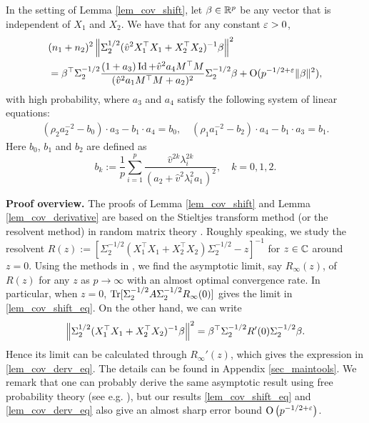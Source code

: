 \begin{lemma}\label{lem_cov_derivative}
In the setting of Lemma \ref{lem_cov_shift}, let $\beta \in \mathbb{R}^p$ be any vector that is independent of $X_1$ and $X_2$. We have that for any constant ${\varepsilon}>0$,
\begin{equation}\label{lem_cov_derv_eq}
\begin{split}
&(n_1+n_2)^2\left\| \Sigma_2^{1/2} (\hat v^2 X_1^{\top}X_1 + X_2^{\top}X_2)^{-1}\beta \right\|^2 \\
&= \beta^{\top} \Sigma_2^{-1/2}  \frac{(1 + a_3)\operatorname{Id} + \hat v^2a_4 {M}^{\top}{M}}{( \hat v^2a_1 {M}^{\top}{M}+a_2)^2} \Sigma_2^{-1/2} \beta +\operatorname{O}(p^{-1/2+{\varepsilon}}\|\beta\|^2),
\end{split}
\end{equation}
with high probability, where $a_{3}$ and $a_4$ satisfy the following system of linear equations:
\begin{gather}\label{eq_a34extra}
		\left(\rho_2  a_2^{-2}-  b_0\right)\cdot  a_3 - b_1 \cdot  a_4
		= b_0, \quad \left(\rho_1 a_1^{-2} -  b_2  \right)\cdot  a_4 -  b_1 \cdot  a_3 = b_1 .
	\end{gather}
Here $b_0$, $b_1$ and $b_2$ are defined as
$$ b_k:= \frac1{p}\sum_{i=1}^p \frac{ \hat v^{2k}\lambda_i^{2k}}{ ( a_2 + \hat v^2\lambda_i^2 a_1)^2  },\quad k=0,1,2.$$
\end{lemma}



\textbf{Proof overview.}
The proofs of Lemma \ref{lem_cov_shift} and Lemma \ref{lem_cov_derivative} are based on the Stieltjes transform method (or the resolvent method) in random matrix theory \cite{bai2009spectral,tao2012topics,erdos2017dynamical}. Roughly speaking, we study the resolvent $R(z):=[\Sigma_2^{-1/2}( X_1^{\top}X_1 + X_2^{\top}X_2)\Sigma_2^{-1/2}-z]^{-1}$ for $z\in \mathbb{C}$ around $z=0$.
Using the methods in \cite{Anisotropic,yang2019spiked}, we find the asymptotic limit, say $R_\infty(z)$, of $R(z)$ for any $z$ as $p\to \infty$ with an almost optimal convergence rate. In particular, when $z=0$, $\operatorname{Tr}[\Sigma_2^{-1/2}A\Sigma_2^{-1/2}R_\infty(0)]$ gives the limit in \eqref{lem_cov_shift_eq}. 
On the other hand, we can write 
$$\left\| \Sigma_2^{1/2} (X_1^{\top}X_1 + X_2^{\top}X_2)^{-1}\beta \right\|^2= \beta^\top \Sigma_2^{-1/2}R'(0)\Sigma_2^{-1/2} \beta.$$ 
Hence its limit can be calculated through $R_\infty'(z)$, which gives the expression in \eqref{lem_cov_derv_eq}. The details can be found in Appendix \ref{sec_maintools}. 
We remark that one can probably derive the same asymptotic result using free probability theory (see e.g. \cite{nica2006lectures}), but our results \eqref{lem_cov_shift_eq} and \eqref{lem_cov_derv_eq} also give an almost sharp error bound $\operatorname{O}\left( p^{-1/2+\varepsilon}\right)$.


